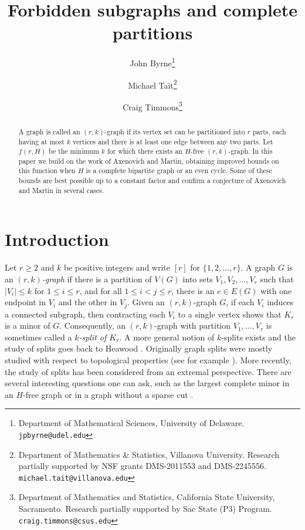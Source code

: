 \documentclass[12pt]{article}%
\title{Forbidden subgraphs and complete partitions}
\author{John Byrne\thanks{Department of Mathematical Sciences, University of Delaware. \texttt{jpbyrne@udel.edu}} \and Michael Tait\thanks{Department of Mathematics \& Statistics, Villanova University. Research partially supported by NSF grants DMS-2011553 and DMS-2245556. \texttt{michael.tait@villanova.edu}} \and Craig Timmons\thanks{Department of Mathematics and Statistics, California State University, Sacramento.  Research partially supported by Sac State (P3) Program.  
\texttt{craig.timmons@csus.edu}}}
\begin{document}
\maketitle

\begin{abstract}
    A graph is called an $(r,k)$-graph if its vertex set can be partitioned into $r$ parts, each having at most $k$ vertices and there is at least one edge between any two parts. Let $f(r,H)$ be the minimum $k$ for which there exists an $H$-free $(r,k)$-graph. In this paper we build on the work of Axenovich and Martin, obtaining improved bounds on this function when $H$ is a complete bipartite graph or an even cycle.  Some of these bounds are best possible up to a constant factor
    and confirm a conjecture of Axenovich and Martin in several cases.  
    \end{abstract}



\section{Introduction}

Let $r \geq 2$ and $k$ be positive integers and 
write $[r]$ for $\{1,2, \dots ,r \}$.
A graph $G$ is an \emph{$(r,k)$-graph} if there is a partition of $V(G)$ into  sets $V_1, V_2, \dots , V_r$ such that $|V_i| \leq k$ for $1 \leq i \leq r$, and for all $1 \leq i < j \leq r$, there is 
an $e \in E(G)$ with one endpoint in $V_i$ and the other in $V_j$.   
Given an $(r,k)$-graph $G$, if each $V_i$ induces a connected subgraph, then contracting each $V_i$ to a single vertex shows that $K_r$ is a minor of $G$. Consequently, an $(r,k)$-graph with partition $V_1,\dots, V_r$ is sometimes called a \textit{$k$-split of $K_r$}.  A more general notion of $k$-splits exists and the study of splits goes back to Heawood \cite{heawood}.    
Originally graph splits were mostly studied with respect to topological properties (see for example \cite{planarsplit}).  More recently, the study of splits has been considered from an extremal perspective. 
There are several interesting questions one can ask, such as the largest complete minor in an $H$-free graph \cite{Fox, KrivSudakov} or in a graph without a sparse cut \cite{KrivNenadov}.  
\end{document}
